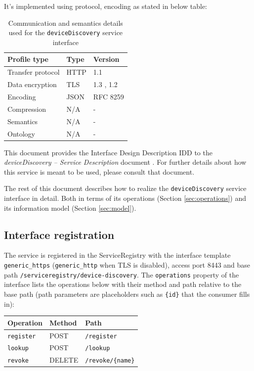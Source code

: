 \documentclass[a4paper]{arrowhead}
\begin{document}
It's implemented using protocol, encoding as stated in below table:
\begin{table}[ht!]
  \centering
  \begin{tabular}{|l|l|l|}
    \hline
    \rowcolor{gray!33} Profile type & Type & Version \\ \hline
    Transfer protocol & HTTP & 1.1 \cite{rfc9112} \\ \hline
    Data encryption & TLS & 1.3 \cite{rfc8446}, 1.2 \cite{rfc5246} \\ \hline
    Encoding & JSON & RFC 8259 \cite{rfc8259} \\ \hline
    Compression & N/A & - \\ \hline
    Semantics & N/A & - \\ \hline
    Ontology & N/A & - \\ \hline
  \end{tabular}
  \caption{Communication and semantics details used for the \texttt{deviceDiscovery} service interface}
  \label{tab:comunication_semantics_profile}
\end{table}

This document provides the Interface Design Description IDD to the \textit{deviceDiscovery -- Service Description} document \cite{sr-deviceDiscovery-sd}.
For further details about how this service is meant to be used, please consult that document.

The rest of this document describes how to realize the \texttt{deviceDiscovery} service
interface in detail. Both in terms of its operations (Section \ref{sec:operations}) and its information model (Section \ref{sec:model}).

\subsection{Interface registration}

The service is registered in the ServiceRegistry with the interface template \texttt{generic\_\allowbreak{}https} (\texttt{generic\_\allowbreak{}http} when TLS is disabled), access port 8443 and base path \texttt{/\allowbreak{}serviceregistry/\allowbreak{}device-\allowbreak{}discovery}. The \texttt{operations} property of the interface lists the operations below with their method and path relative to the base path (path parameters are placeholders such as \texttt{\{id\}} that the consumer fills in):

\noindent\begin{longtable}{| p{5.2cm} | p{1.6cm} | p{8.4cm} |} \hline
\rowcolor{gray!33} Operation & Method & Path \\ \hline \endhead
\texttt{register} & POST & \texttt{/\allowbreak{}register} \\ \hline
\texttt{lookup} & POST & \texttt{/\allowbreak{}lookup} \\ \hline
\texttt{revoke} & DELETE & \texttt{/\allowbreak{}revoke/\allowbreak{}\{name\}} \\ \hline
\end{longtable}
\end{document}
